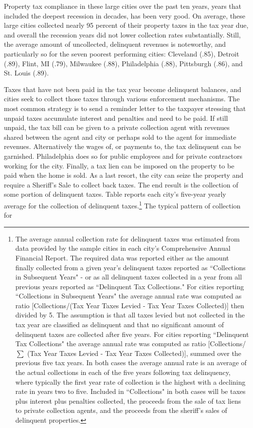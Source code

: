 \documentclass[12pt,titlepage]{article}
\begin{document}
Property tax compliance in these large cities over the past ten years,
years that included the deepest recession in decades, has been very
good.  On average, these large cities collected nearly 95 percent of
their property taxes in the tax year due, and overall the recession years did
not lower collection rates substantially.  Still, the average
amount of uncollected, delinquent revenues is noteworthy, and
particularly so for the seven poorest performing cities: Cleveland
(.85), Detroit (.89), Flint, MI (.79), Milwaukee (.88), Philadelphia
(.88), Pittsburgh (.86), and St. Louis (.89).

Taxes that have not been paid in the tax year become delinquent
balances, and cities seek to collect those taxes through various
enforcement mechanisms.  The most common strategy is to send a
reminder letter to the taxpayer stressing that unpaid taxes accumulate
interest and penalties and need to be paid.  If still unpaid, the tax
bill can be given to a private collection agent with revenues shared
between the agent and city or perhaps sold to the agent for immediate
revenues.  Alternatively the wages of, or payments to, the tax delinquent can be
garnished.  Philadelphia does so for public employees and for private
contractors working for the city.  Finally, a tax lien can be imposed
on the property to be paid when the home is sold.  As a last resort,
the city can seize the property and require a Sheriff's Sale to
collect back taxes.  The end result is the collection of some portion
of delinquent taxes.  Table \label{table:comp} reports each city's five-year yearly
average for the collection of delinquent taxes.\footnote{The average
  annual collection rate for delinquent taxes was estimated from data
  provided by the sample cities in each city's Comprehensive Annual
  Financial Report.  The required data was reported either as the
  amount finally collected from a given year's delinquent taxes\textemdash
  reported as ``Collections in Subsequent Years" - or as all
  delinquent taxes collected in a year from all previous years\textemdash
  reported as ``Delinquent Tax Collections."  For cities reporting
  ``Collections in Subsequent Years" the average annual rate was
  computed as ratio [Collections/(Tax Year Taxes Levied - Tax Year
    Taxes Collected)] then divided by 5.  The assumption is that all
  taxes levied but not collected in the tax year are classified as
  delinquent and that no significant amount of delinquent taxes are
  collected after five years.  For cities reporting ``Delinquent Tax
  Collections" the average annual rate was computed as ratio
  [Collections/ $\sum$ (Tax Year Taxes Levied - Tax Year Taxes
    Collected)], summed over the previous five tax years.  In both
  cases the average annual rate is an average of the actual
  collections in each of the five years following tax delinquency,
  where typically the first year rate of collection is the highest
  with a declining rate in years two to five.  Included in
  ``Collections" in both cases will be taxes plus interest plus
  penalties collected, the proceeds from the sale of tax liens to
  private collection agents, and the proceeds from the sheriff's sales
  of delinquent properties.} The typical pattern of collection for
\end{document}
